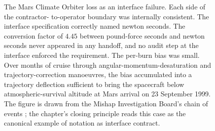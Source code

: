 \begin{figure}[p]
\caption[Mars Climate Orbiter interface failure]{The Mars Climate
Orbiter loss as an interface failure. Each side of the contractor-
to-operator boundary was internally consistent. The interface
specification correctly named newton seconds. The conversion factor
of $4.45$ between pound-force seconds and newton seconds never
appeared in any handoff, and no audit step at the interface enforced
the requirement. The per-burn bias was small. Over months of cruise
through angular-momentum-desaturation and trajectory-correction
manoeuvres, the bias accumulated into a trajectory deflection
sufficient to bring the spacecraft below atmospheric-survival
altitude at Mars arrival on 23 September 1999. The figure is drawn
from the Mishap Investigation Board's chain of events
\cite{acc:nasa-mco-mib}; the chapter's closing principle reads this
case as the canonical example of notation as interface contract.}
\label{fig:vol02:ch01:mco-interface}
\end{figure}
